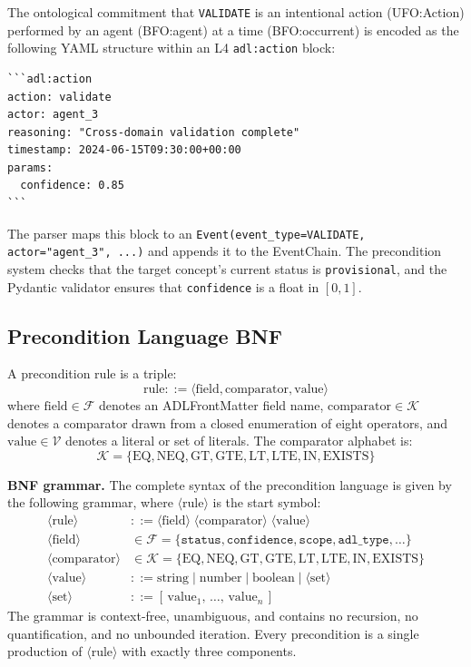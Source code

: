 The ontological commitment that \texttt{VALIDATE} is an intentional action (UFO:Action) performed by an agent (BFO:agent) at a time (BFO:occurrent) is encoded as the following YAML structure within an L4 \texttt{adl:action} block:

\begin{verbatim}
```adl:action
action: validate
actor: agent_3
reasoning: "Cross-domain validation complete"
timestamp: 2024-06-15T09:30:00+00:00
params:
  confidence: 0.85
```
\end{verbatim}

The parser maps this block to an \texttt{Event(event\_type=VALIDATE, actor="agent\_3", ...)} and appends it to the EventChain. The precondition system checks that the target concept's current status is \texttt{provisional}, and the Pydantic validator ensures that \texttt{confidence} is a float in $[0, 1]$.

\subsection{Precondition Language BNF}

A precondition rule is a triple:
\begin{equation}
    \text{rule} ::= \langle \text{field}, \text{comparator}, \text{value} \rangle
\end{equation}
where $\text{field} \in \mathcal{F}$ denotes an ADLFrontMatter field name, $\text{comparator} \in \mathcal{K}$ denotes a comparator drawn from a closed enumeration of eight operators, and $\text{value} \in \mathcal{V}$ denotes a literal or set of literals. The comparator alphabet is:
\begin{equation}
    \mathcal{K} = \{\text{EQ}, \text{NEQ}, \text{GT}, \text{GTE}, \text{LT}, \text{LTE}, \text{IN}, \text{EXISTS}\}
\end{equation}

\textbf{BNF grammar.} The complete syntax of the precondition language is given by the following grammar, where $\langle\text{rule}\rangle$ is the start symbol:
\begin{align}
    \langle\text{rule}\rangle &::= \langle\text{field}\rangle\; \langle\text{comparator}\rangle\; \langle\text{value}\rangle \\
    \langle\text{field}\rangle &\in \mathcal{F} = \{\texttt{status}, \texttt{confidence}, \texttt{scope}, \texttt{adl\_type}, \dots\} \\
    \langle\text{comparator}\rangle &\in \mathcal{K} = \{\text{EQ}, \text{NEQ}, \text{GT}, \text{GTE}, \text{LT}, \text{LTE}, \text{IN}, \text{EXISTS}\} \\
    \langle\text{value}\rangle &::= \text{string} \mid \text{number} \mid \text{boolean} \mid \langle\text{set}\rangle \\
    \langle\text{set}\rangle &::= [\,\text{value}_1\text{, }\dots\text{, }\text{value}_n\,]
\end{align}
The grammar is context-free, unambiguous, and contains no recursion, no quantification, and no unbounded iteration. Every precondition is a single production of $\langle\text{rule}\rangle$ with exactly three components.


